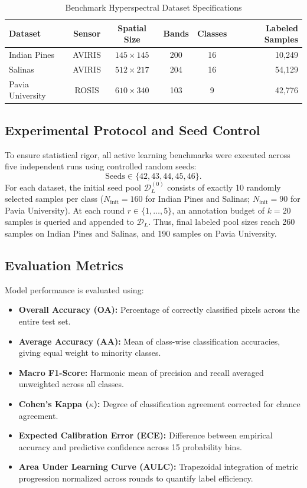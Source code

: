 \documentclass[conference,letterpaper]{IEEEtran}
\begin{document}
\begin{table}[!t]
\caption{Benchmark Hyperspectral Dataset Specifications}
\label{tab:dataset_specs}
\centering
\footnotesize
\setlength{\tabcolsep}{3.5pt}
\begin{tabular}{|l|c|c|c|c|r|}
\hline
\textbf{Dataset} & \textbf{Sensor} & \textbf{Spatial Size} & \textbf{Bands} & \textbf{Classes} & \textbf{Labeled Samples} \\
\hline
Indian Pines & AVIRIS & $145 \times 145$ & 200 & 16 & 10,249 \\
\hline
Salinas & AVIRIS & $512 \times 217$ & 204 & 16 & 54,129 \\
\hline
Pavia University & ROSIS & $610 \times 340$ & 103 & 9 & 42,776 \\
\hline
\end{tabular}
\end{table}

\subsection{Experimental Protocol and Seed Control}
To ensure statistical rigor, all active learning benchmarks were executed across five independent runs using controlled random seeds:
\begin{equation}
\text{Seeds} \in \{42, 43, 44, 45, 46\}.
\end{equation}
For each dataset, the initial seed pool $\mathcal{D}_L^{(0)}$ consists of exactly 10 randomly selected samples per class ($N_{\text{init}} = 160$ for Indian Pines and Salinas; $N_{\text{init}} = 90$ for Pavia University). At each round $r \in \{1, \dots, 5\}$, an annotation budget of $k = 20$ samples is queried and appended to $\mathcal{D}_L$. Thus, final labeled pool sizes reach 260 samples on Indian Pines and Salinas, and 190 samples on Pavia University.

\subsection{Evaluation Metrics}
Model performance is evaluated using:
\begin{itemize}
    \item \textbf{Overall Accuracy (OA):} Percentage of correctly classified pixels across the entire test set.
    \item \textbf{Average Accuracy (AA):} Mean of class-wise classification accuracies, giving equal weight to minority classes.
    \item \textbf{Macro F1-Score:} Harmonic mean of precision and recall averaged unweighted across all classes.
    \item \textbf{Cohen's Kappa ($\kappa$):} Degree of classification agreement corrected for chance agreement.
    \item \textbf{Expected Calibration Error (ECE):} Difference between empirical accuracy and predictive confidence across 15 probability bins.
    \item \textbf{Area Under Learning Curve (AULC):} Trapezoidal integration of metric progression normalized across rounds to quantify label efficiency.
\end{itemize}
\end{document}
